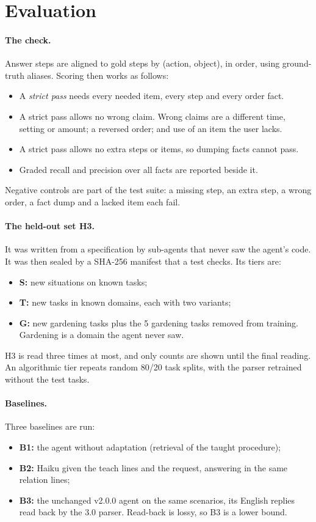 \section{Evaluation}

\paragraph{The check.} Answer steps are aligned to gold steps by (action, object), in order, using ground-truth aliases. Scoring then works as follows:
\begin{itemize}
  \item A \emph{strict pass} needs every needed item, every step and every order fact.
  \item A strict pass allows no wrong claim. Wrong claims are a different time, setting or amount; a reversed order; and use of an item the user lacks.
  \item A strict pass allows no extra steps or items, so dumping facts cannot pass.
  \item Graded recall and precision over all facts are reported beside it.
\end{itemize}
Negative controls are part of the test suite: a missing step, an extra step, a wrong order, a fact dump and a lacked item each fail.

\paragraph{The held-out set H3.} It was written from a specification by sub-agents that never saw the agent's code. It was then sealed by a SHA-256 manifest that a test checks. Its tiers are:
\begin{itemize}
  \item \textbf{S:} \hThreeS{} new situations on known tasks;
  \item \textbf{T:} \hThreeT{} new tasks in known domains, each with two variants;
  \item \textbf{G:} \hThreeG{} new gardening tasks plus the 5 gardening tasks removed from training. Gardening is a domain the agent never saw.
\end{itemize}
H3 is read three times at most, and only counts are shown until the final reading. An algorithmic tier repeats random 80/20 task splits, with the parser retrained without the test tasks.

\paragraph{Baselines.} Three baselines are run:
\begin{itemize}
  \item \textbf{B1:} the agent without adaptation (retrieval of the taught procedure);
  \item \textbf{B2:} Haiku given the teach lines and the request, answering in the same relation lines;
  \item \textbf{B3:} the unchanged v2.0.0 agent on the same scenarios, its English replies read back by the 3.0 parser. Read-back is lossy, so B3 is a lower bound.
\end{itemize}

